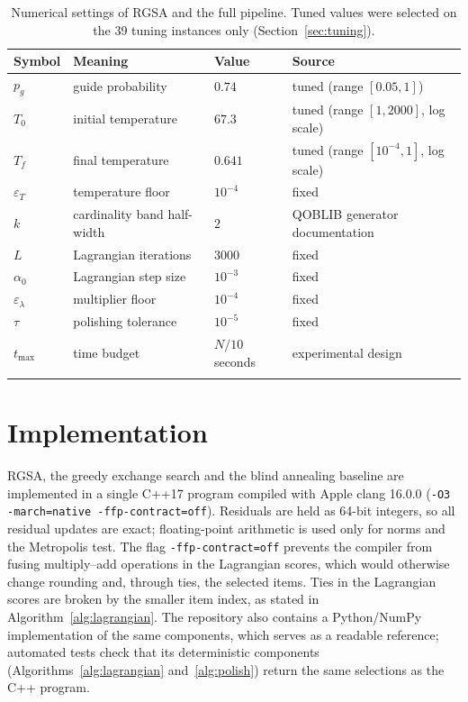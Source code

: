 \documentclass[pdflatex,sn-mathphys-num]{sn-jnl}
\theoremstyle{thmstyleone}
\theoremstyle{thmstylethree}
\begin{document}
\begin{table}[t]
\caption{Numerical settings of RGSA and the full pipeline. Tuned values were selected on the 39 tuning instances only (Section~\ref{sec:tuning}).}\label{tab:params}
\begin{tabular*}{\textwidth}{@{\extracolsep\fill}llll}
\toprule
Symbol & Meaning & Value & Source \\
\midrule
$p_g$ & guide probability & $0.74$ & tuned (range $[0.05,1]$) \\
$T_0$ & initial temperature & $67.3$ & tuned (range $[1,2000]$, log scale) \\
$T_f$ & final temperature & $0.641$ & tuned (range $[10^{-4},1]$, log scale) \\
$\varepsilon_T$ & temperature floor & $10^{-4}$ & fixed \\
$k$ & cardinality band half-width & $2$ & QOBLIB generator documentation \\
$L$ & Lagrangian iterations & $3000$ & fixed \\
$\alpha_0$ & Lagrangian step size & $10^{-3}$ & fixed \\
$\varepsilon_\lambda$ & multiplier floor & $10^{-4}$ & fixed \\
$\tau$ & polishing tolerance & $10^{-5}$ & fixed \\
$t_{\max}$ & time budget & $N/10$ seconds & experimental design \\
\botrule
\end{tabular*}
\end{table}

\section{Implementation}\label{sec:implementation}

RGSA, the greedy exchange search and the blind annealing baseline are implemented in a single C++17 program compiled with Apple clang 16.0.0 (\texttt{-O3 -march=native -ffp-contract=off}). Residuals are held as 64-bit integers, so all residual updates are exact; floating-point arithmetic is used only for norms and the Metropolis test. The flag \texttt{-ffp-contract=off} prevents the compiler from fusing multiply--add operations in the Lagrangian scores, which would otherwise change rounding and, through ties, the selected items. Ties in the Lagrangian scores are broken by the smaller item index, as stated in Algorithm~\ref{alg:lagrangian}. The repository also contains a Python/NumPy implementation of the same components, which serves as a readable reference; automated tests check that its deterministic components (Algorithms~\ref{alg:lagrangian} and~\ref{alg:polish}) return the same selections as the C++ program.
\end{document}
